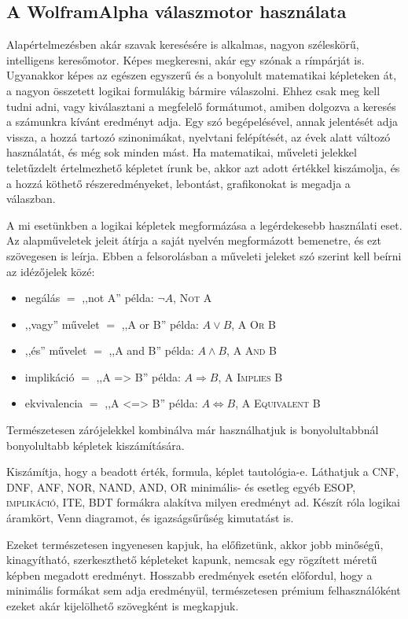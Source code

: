 \documentclass[
]{thesis-ekf}
\theoremstyle{definition}
\theoremstyle{remark}
\begin{document}
		\subsection{A WolframAlpha válaszmotor használata} \label{kif-wolframalpha-hasznalata}
	Alapértelmezésben akár szavak keresésére is alkalmas, nagyon széleskörű, intelligens keresőmotor. Képes megkeresni, akár egy szónak a rímpárját is. Ugyanakkor képes az egészen egyszerű és a bonyolult matematikai képleteken át, a nagyon összetett logikai formulákig bármire válaszolni. Ehhez csak meg kell tudni adni, vagy kiválasztani a megfelelő formátumot, amiben dolgozva a keresés a számunkra kívánt eredményt adja. Egy szó begépelésével, annak jelentését adja vissza, a hozzá tartozó szinonimákat, nyelvtani felépítését, az évek alatt változó használatát, és még sok minden mást. Ha matematikai, műveleti jelekkel teletűzdelt értelmezhető képletet írunk be, akkor azt adott értékkel kiszámolja, és a hozzá köthető részeredményeket, lebontást, grafikonokat is megadja a válaszban.
	
	A mi esetünkben a logikai képletek megformázása a legérdekesebb használati eset. Az alapműveletek jeleit átírja a saját nyelvén megformázott bemenetre, és ezt szövegesen is leírja. Ebben a felsorolásban a műveleti jeleket szó szerint kell beírni az idézőjelek közé:
	\begin{itemize}
		\item negálás $ = $ ,,not A'' példa: $ \neg A $, \textsc{Not A}
		\item ,,vagy'' művelet $ = $ ,,A or B'' példa: $ A\vee B $, \textsc{A Or B}
		\item ,,és'' művelet $ = $ ,,A and B'' példa: $ A\wedge B $, \textsc{A And B}
		\item implikáció $ = $ ,,A => B'' példa: $ A\Rightarrow B $, \textsc{A Implies B}
		\item ekvivalencia $ = $ ,,A <=> B'' példa: $ A\Leftrightarrow B $, \textsc{A Equivalent B}
	\end{itemize}
	Természetesen zárójelekkel kombinálva már használhatjuk is bonyolultabbnál bonyolultabb képletek kiszámítására.
	
	Kiszámítja, hogy a beadott érték, formula, képlet tautológia-e. Láthatjuk a \textsc{CNF, DNF, ANF, NOR, NAND, AND, OR} minimális- és esetleg egyéb \textsc{ESOP, implikáció, ITE, BDT} formákra alakítva milyen eredményt ad. Készít róla logikai áramkört, Venn diagramot, és igazságsűrűség kimutatást is.
	
	Ezeket természetesen ingyenesen kapjuk, ha előfizetünk, akkor jobb minőségű, kinagyítható, szerkeszthető képleteket kapunk, nemcsak egy rögzített méretű képben megadott eredményt. Hosszabb eredmények esetén előfordul, hogy a minimális formákat sem adja eredményül, természetesen prémium felhasználóként ezeket akár kijelölhető szövegként is megkapjuk.
	
\end{document}
